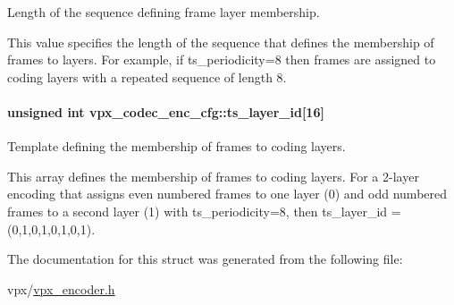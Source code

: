 Length of the sequence defining frame layer membership. 

This value specifies the length of the sequence that defines the membership of frames to layers. For example, if ts\+\_\+periodicity=8 then frames are assigned to coding layers with a repeated sequence of length 8. \hypertarget{structvpx__codec__enc__cfg_a4d105d2470dbfb7210b33d298f1cf1f6}{
\paragraph[{ts\+\_\+layer\+\_\+id}]{\setlength{\rightskip}{0pt plus 5cm}unsigned int vpx\+\_\+codec\+\_\+enc\+\_\+cfg\+::ts\+\_\+layer\+\_\+id\mbox{[}16\mbox{]}}}\label{structvpx__codec__enc__cfg_a4d105d2470dbfb7210b33d298f1cf1f6}


Template defining the membership of frames to coding layers. 

This array defines the membership of frames to coding layers. For a 2-\/layer encoding that assigns even numbered frames to one layer (0) and odd numbered frames to a second layer (1) with ts\+\_\+periodicity=8, then ts\+\_\+layer\+\_\+id = (0,1,0,1,0,1,0,1). 

The documentation for this struct was generated from the following file\+:\begin{DoxyCompactItemize}
\item 
vpx/\hyperlink{vpx__encoder_8h}{vpx\+\_\+encoder.\+h}\end{DoxyCompactItemize}
